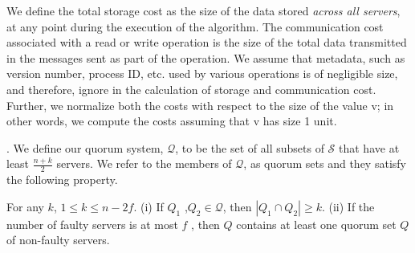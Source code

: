 We define the total storage cost as the size of the
data stored \textit{across all servers}, at any point during the execution of the algorithm. The
communication cost associated with a read or write operation is the size of the total data transmitted in the messages sent as part of the operation. We assume that metadata,
such as version number, process ID, etc. used by various operations is of negligible size, and therefore,  ignore in the calculation of storage and communication cost. Further, we normalize
both the costs with respect to the size of the value v; in other words, we compute the costs
assuming that v has size 1 unit.

 
. We define our quorum system, $\mathcal{Q}$, to be the set of all subsets of $\mathcal{S}$ that have at least $\frac{n+k}{2}$ servers. We refer to the members of $\mathcal{Q}$, as quorum sets and they satisfy the following property.

\begin{lemma}
For any $k$,  $1 \leq k \leq n -2f$. (i) If $Q_1$ ,$Q_2 \in \mathcal{Q}$,
then $|Q_1 \cap Q_2 | \geq k$. (ii) If the number of faulty servers is
at most $f$ , then $Q$ contains at least one quorum set $Q$ of
non-faulty servers.
\end{lemma}


